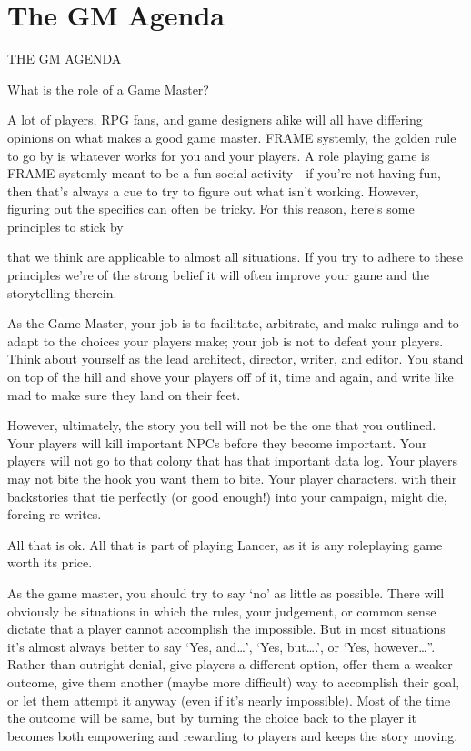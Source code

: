 \chapter{The GM Agenda}
                                         THE GM AGENDA

What is the role of a Game Master?


A lot of players, RPG fans, and game designers alike will all have differing opinions on what
makes a good game master. FRAME systemly, the golden rule to go by is whatever works for
you and your players. A role playing game is FRAME systemly meant to be a fun social activity -
if you’re not having fun, then that’s always a cue to try to figure out what isn’t working. However,
figuring out the specifics can often be tricky. For this reason, here’s some principles to stick by




that we think are applicable to almost all situations. If you try to adhere to these principles we’re
of the strong belief it will often improve your game and the storytelling therein.


As the Game Master, your job is to facilitate, arbitrate, and make rulings and to adapt to the
choices your players make; your job is not to defeat your players. Think about yourself as the
lead architect, director, writer, and editor. You stand on top of the hill and shove your players off
of it, time and again, and write like mad to make sure they land on their feet.


However, ultimately, the story you tell will not be the one that you outlined. Your players will
kill important NPCs before they become important. Your players will not go to that colony that
has that important data log. Your players may not bite the hook you want them to bite. Your
player characters, with their backstories that tie perfectly (or good enough!) into your campaign,
might die, forcing re-writes.


All that is ok. All that is part of playing Lancer, as it is any roleplaying game worth its price.


As the game master, you should try to say ‘no’ as little as possible. There will obviously be
situations in which the rules, your judgement, or common sense dictate that a player cannot
accomplish the impossible. But in most situations it’s almost always better to say ‘Yes, and…’,
‘Yes, but….’, or ‘Yes, however…”. Rather than outright denial, give players a different option,
offer them a weaker outcome, give them another (maybe more difficult) way to accomplish their
goal, or let them attempt it anyway (even if it’s nearly impossible). Most of the time the outcome
will be same, but by turning the choice back to the player it becomes both empowering and
rewarding to players and keeps the story moving.


